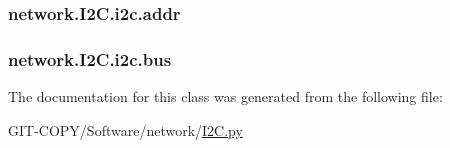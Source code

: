 \subsubsection[{addr}]{\setlength{\rightskip}{0pt plus 5cm}network.\+I2\+C.\+i2c.\+addr}\label{classnetwork_1_1I2C_1_1i2c_a2b5c11f2acf663fa0349d18714a60db6}
\hypertarget{classnetwork_1_1I2C_1_1i2c_a60c56af8dc524a1ef92e36e97d8927c7}{}
\subsubsection[{bus}]{\setlength{\rightskip}{0pt plus 5cm}network.\+I2\+C.\+i2c.\+bus}\label{classnetwork_1_1I2C_1_1i2c_a60c56af8dc524a1ef92e36e97d8927c7}


The documentation for this class was generated from the following file\+:\begin{DoxyCompactItemize}
\item 
G\+I\+T-\/\+C\+O\+P\+Y/\+Software/network/\hyperlink{GIT-COPY_2Software_2network_2I2C_8py}{I2\+C.\+py}\end{DoxyCompactItemize}
